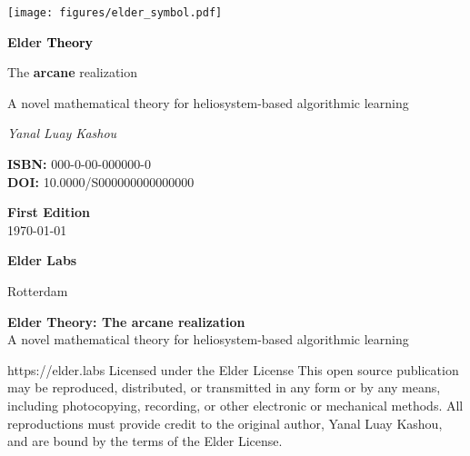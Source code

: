 \documentclass[11pt,twoside]{book}
\begin{document}
\frontmatter

\begin{titlepage}
    \centering
    \vspace*{0.5cm}
    \texttt{[image: figures/elder\_symbol.pdf]}
    \vspace{0.5cm}
    
    {\Huge\bfseries \textcolor{DarkSkyBlue}{Elder }\textrm{\textcolor{black}{Theory}}\par}
    \vspace{0.8cm}
    {\Large The \textcolor{DarkSkyBlue}{\textbf{arcane}} realization\par}
    \vspace{0.3cm}
    {\large A novel mathematical theory for heliosystem-based algorithmic learning\par}
    
    \vspace{3cm}
    {\Large\itshape Yanal Luay Kashou\par}

    \vfill
    
    \begin{minipage}{0.4\textwidth}
        \begin{flushleft}
            \textbf{ISBN:} 000-0-00-000000-0 \\
            \textbf{DOI:} 10.0000/S000000000000000
        \end{flushleft}
    \end{minipage}%
    \begin{minipage}{0.4\textwidth}
        \begin{flushright}
            \textbf{First Edition} \\
            \today
        \end{flushright}
    \end{minipage}
    
    \vspace{1cm}
    {\large \textbf{Elder Labs}\par}
    {\small Rotterdam\par}
\end{titlepage}

\thispagestyle{empty}
\vspace*{3cm}
\begin{center}
    {\Large\bfseries Elder Theory: The arcane realization}\\[2mm]
    {\large A novel mathematical theory for heliosystem-based algorithmic learning}
\end{center}
https://elder.labs
\vspace{2cm}
\noindent
Licensed under the Elder License
\vspace{0.5cm}
\noindent
This open source publication may be reproduced, distributed, or transmitted in any form or by any means, including photocopying, recording, or other electronic or mechanical methods. All reproductions must provide credit to the original author, Yanal Luay Kashou, and are bound by the terms of the Elder License.
\vspace{0.5cm}
\end{document}
